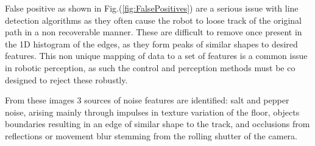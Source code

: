        False positive as shown in Fig.(\ref{fig:FalsePositives}) are a serious issue with line detection algorithms as 
        they often cause the robot to loose track of the original path in a non recoverable manner.
        These are difficult to remove once present in the 1D histogram of the edges, as they form peaks of similar shapes to desired features. 
        This non unique mapping of data to a set of features is a common issue in robotic perception, as such the control and perception methods 
        must be co designed to reject these robustly.
        
        From these images 3 sources of noise features are identified: salt and pepper noise, arising mainly through impulses in texture 
        variation of the floor, objects boundaries resulting in an edge of similar shape to the track, and occlusions from reflections 
        or movement blur stemming from the rolling shutter of the camera.

